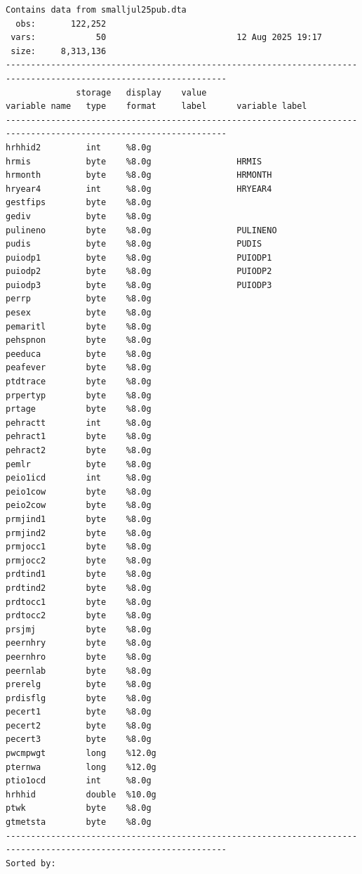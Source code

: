 \documentclass[
]{book}
\begin{document}
\begin{verbatim}
Contains data from smalljul25pub.dta
  obs:       122,252                          
 vars:            50                          12 Aug 2025 19:17
 size:     8,313,136                          
------------------------------------------------------------------------------------------------------------------
              storage   display    value
variable name   type    format     label      variable label
------------------------------------------------------------------------------------------------------------------
hrhhid2         int     %8.0g                 
hrmis           byte    %8.0g                 HRMIS
hrmonth         byte    %8.0g                 HRMONTH
hryear4         int     %8.0g                 HRYEAR4
gestfips        byte    %8.0g                 
gediv           byte    %8.0g                 
pulineno        byte    %8.0g                 PULINENO
pudis           byte    %8.0g                 PUDIS
puiodp1         byte    %8.0g                 PUIODP1
puiodp2         byte    %8.0g                 PUIODP2
puiodp3         byte    %8.0g                 PUIODP3
perrp           byte    %8.0g                 
pesex           byte    %8.0g                 
pemaritl        byte    %8.0g                 
pehspnon        byte    %8.0g                 
peeduca         byte    %8.0g                 
peafever        byte    %8.0g                 
ptdtrace        byte    %8.0g                 
prpertyp        byte    %8.0g                 
prtage          byte    %8.0g                 
pehractt        int     %8.0g                 
pehract1        byte    %8.0g                 
pehract2        byte    %8.0g                 
pemlr           byte    %8.0g                 
peio1icd        int     %8.0g                 
peio1cow        byte    %8.0g                 
peio2cow        byte    %8.0g                 
prmjind1        byte    %8.0g                 
prmjind2        byte    %8.0g                 
prmjocc1        byte    %8.0g                 
prmjocc2        byte    %8.0g                 
prdtind1        byte    %8.0g                 
prdtind2        byte    %8.0g                 
prdtocc1        byte    %8.0g                 
prdtocc2        byte    %8.0g                 
prsjmj          byte    %8.0g                 
peernhry        byte    %8.0g                 
peernhro        byte    %8.0g                 
peernlab        byte    %8.0g                 
prerelg         byte    %8.0g                 
prdisflg        byte    %8.0g                 
pecert1         byte    %8.0g                 
pecert2         byte    %8.0g                 
pecert3         byte    %8.0g                 
pwcmpwgt        long    %12.0g                
pternwa         long    %12.0g                
ptio1ocd        int     %8.0g                 
hrhhid          double  %10.0g                
ptwk            byte    %8.0g                 
gtmetsta        byte    %8.0g                 
------------------------------------------------------------------------------------------------------------------
Sorted by: 
\end{verbatim}
\end{document}
